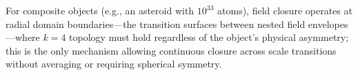 
For composite objects (e.g., an asteroid with $10^{33}$ atoms), field closure operates at radial domain boundaries—the transition surfaces between nested field envelopes—where $k=4$ topology must hold regardless of the object's physical asymmetry; this is the only mechanism allowing continuous closure across scale transitions without averaging or requiring spherical symmetry.
